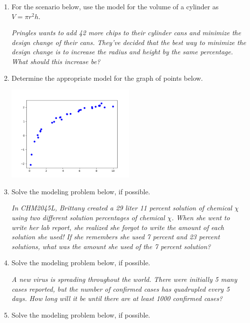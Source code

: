 \documentclass[14pt]{extbook}
\begin{document}
\begin{enumerate}
{\begin{center}
\end{center}
} \newpage
\item{
For the scenario below, use the model for the volume of a cylinder as $V = \pi r^2 h$.
\begin{center}
    \textit{ Pringles wants to add 42  more chips to their cylinder cans and minimize the design change of their cans. They've decided that the best way to minimize the design change is to increase the radius and height by the same percentage. What should this increase be? }
\end{center}
} \newpage
\item{
Determine the appropriate model for the graph of points below.
\begin{center}
    \includegraphics[width=0.5\textwidth]{../Figures/identifyModelGraph12A.png}
\end{center}
} \newpage
\item{
Solve the modeling problem below, if possible.
\begin{center}
    \textit{ In CHM2045L, Brittany created a 29 liter 11 percent solution of chemical $\chi$ using two different solution percentages of chemical $\chi$. When she went to write her lab report, she realized she forgot to write the amount of each solution she used! If she remembers she used 7 percent and 23 percent solutions, what was the amount she used of the 7 percent solution? }
\end{center}
} \newpage
\item{
Solve the modeling problem below, if possible.
\begin{center}
    \textit{ A new virus is spreading throughout the world. There were initially 5 many cases reported, but the number of confirmed cases has quadrupled every 5 days. How long will it be until there are at least 1000 confirmed cases? }
\end{center}
} \newpage
\item{
Solve the modeling problem below, if possible.
\begin{center}

\end{center}}
\end{enumerate}
\end{document}
